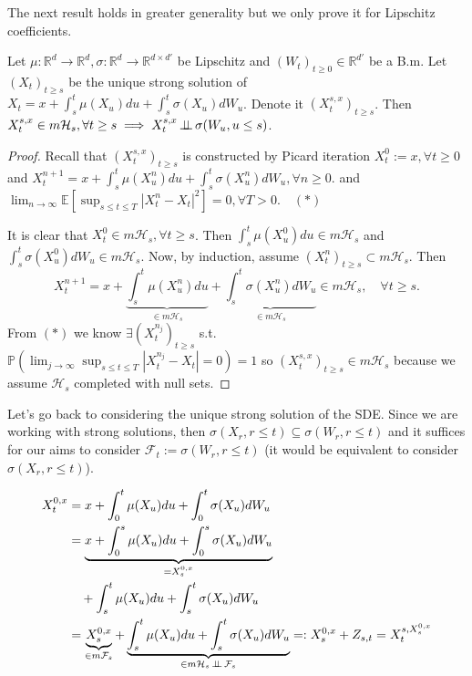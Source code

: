 \begin{remark}
    The next result holds in greater generality but we only prove it for Lipschitz coefficients.
\end{remark}

\begin{proposition}
    Let $\mu: \mathbb{R}^d \to \mathbb{R}^d, \sigma: \mathbb{R}^d \to \mathbb{R}^{d \times d'}$ be Lipschitz and $(W_t)_{t \ge 0} \in \mathbb{R}^{d'}$ be a B.m. Let $(X_t)_{t \ge s}$ be the unique strong solution of $X_t = x + \int_s^t \mu(X_u)du + \int_s^t \sigma(X_u)dW_u$. Denote it $(X_t^{s,x})_{t \ge s}$.
    Then $X_t^{s,x} \in m\mathcal{H}_s, \forall t \ge s \implies X_t^{s,x} \operatorname{\perp\!\!\!\perp} \sigma(W_u, u \le s)$.
\end{proposition}

\begin{proof}
    Recall that $(X_t^{s,x})_{t \ge s}$ is constructed by Picard iteration
    $X_t^0 := x, \forall t \ge 0$ and $X_t^{n+1} = x + \int_s^t \mu(X_u^n)du + \int_s^t \sigma(X_u^n)dW_u, \forall n \ge 0$.
    and $\lim_{n \to \infty} \mathbb{E}[\sup_{s \le t \le T} |X_t^n - X_t|^2] = 0, \forall T > 0. \quad (*)$
    
    It is clear that $X_t^0 \in m\mathcal{H}_s, \forall t \ge s$. Then $\int_s^t \mu(X_u^0)du \in m\mathcal{H}_s$ and $\int_s^t \sigma(X_u^0)dW_u \in m\mathcal{H}_s$.
    Now, by induction, assume $(X_t^n)_{t \ge s} \subset m\mathcal{H}_s$. Then
    $$X_t^{n+1} = x + \underbrace{\int_s^t \mu(X_u^n)du}_{\in m\mathcal{H}_s} + \underbrace{\int_s^t \sigma(X_u^n)dW_u}_{\in m\mathcal{H}_s} \in m\mathcal{H}_s, \quad \forall t \ge s.$$
    From $(*)$ we know $\exists (X_t^{n_j})_{t \ge s}$ s.t. $\mathbb{P}(\lim_{j \to \infty} \sup_{s \le t \le T} |X_t^{n_j} - X_t| = 0) = 1$ so $(X_t^{s,x})_{t \ge s} \in m\mathcal{H}_s$ because we assume $\mathcal{H}_s$ completed with null sets.
\end{proof}

Let's go back to considering the unique strong solution of the SDE. Since we are working with strong solutions, then $\sigma(X_r, r \le t) \subseteq \sigma(W_r, r \le t)$ and it suffices for our aims to consider $\mathcal{F}_t := \sigma(W_r, r \le t)$ (it would be equivalent to consider $\sigma(X_r, r \le t)$).

\begin{align*}
    X_t^{0,x} &= x + \int_0^t \mu(X_u)du + \int_0^t \sigma(X_u)dW_u \\
    &= \underbrace{x + \int_0^s \mu(X_u)du + \int_0^s \sigma(X_u)dW_u}_{= X_s^{0,x}} \\
    &\quad + \int_s^t \mu(X_u)du + \int_s^t \sigma(X_u)dW_u \\
    &= \underbrace{X_s^{0,x}}_{\in m\mathcal{F}_s} + \underbrace{\int_s^t \mu(X_u)du + \int_s^t \sigma(X_u)dW_u}_{\in m\mathcal{H}_s \operatorname{\perp\!\!\!\perp} \mathcal{F}_s} =: X_s^{0,x} + Z_{s,t} = X_t^{s, X_s^{0,x}}
\end{align*}

